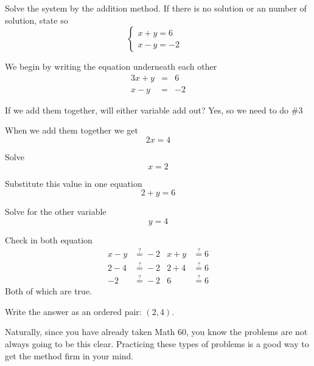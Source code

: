 \begin{myexample}
Solve the system by the addition method. If there is no solution or an number of solution, state so
\[
	\begin{cases}
		x+y  =6  &   \\
		x-y  =-2 &   
	\end{cases}
\]
{}
\end{myexample}
\begin{myProof}
	\begin{steps}
		\item We begin by writing the equation underneath each other
		\begin{alignat*}{3}
			x+y & {}={} & 6  \\
			x-y & {}={} & -2 
		\end{alignat*}
		\item If we add them together, will either variable add out? {\color{red} Yes, so we need to do \#3}
		\item When we add them together we get
		\[
			2x = 4
		\]
		\item Solve
		\[
			x = 2
		\]
		\item Substitute this value in one equation
		\[
			2+y=6
		\]		
		\item Solve for the other variable
		\[
			y = 4
		\]
		\item Check in both equation
		\begin{align*}
			x-y & \stackrel{?}{=} -2 & x+y & \stackrel{?}{=}	 6 \\
			2-4 & \stackrel{?}{=} -2 & 2+4 & \stackrel{?}{=}	 6 \\
			-2  & \stackrel{?}{=} -2 & 6   & \stackrel{?}{=}	 6 
		\end{align*} 
		Both of which are true.
		\item Write the answer as an ordered pair: $(2,4)$.
	\end{steps} 
	Naturally, since you have already taken Math 60, you know the problems are not always going to be this clear.
	Practicing these types of problems is a good way to get the method firm in your mind.
\end{myProof} 
																																						
